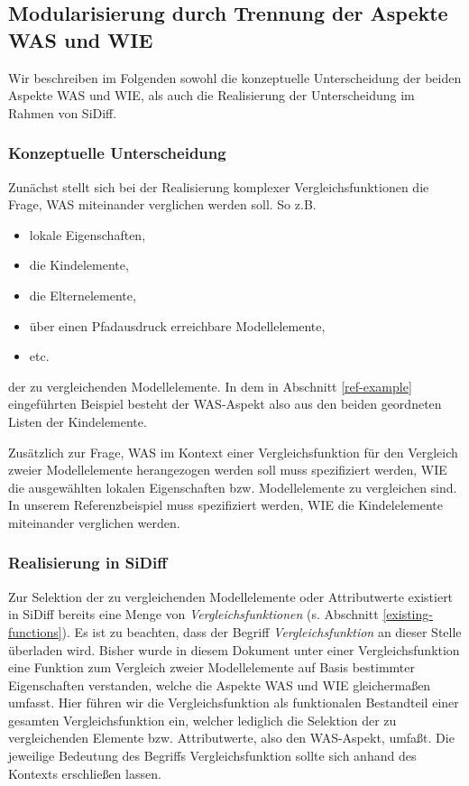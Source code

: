 \documentclass[10pt,a4paper]{scrartcl}
\begin{document}
\subsection{Modularisierung durch Trennung der Aspekte WAS und WIE}
\label{modularisation}

Wir beschreiben im Folgenden sowohl die konzeptuelle Unterscheidung der beiden Aspekte
WAS und WIE, als auch die Realisierung der Unterscheidung im Rahmen von SiDiff.

\subsubsection{Konzeptuelle Unterscheidung}
Zunächst stellt sich bei der Realisierung komplexer Vergleichsfunktionen
die Frage, WAS miteinander verglichen werden soll. So z.B. 
\begin{itemize}
	\item lokale Eigenschaften,
	\item die Kindelemente,
	\item die Elternelemente,
	\item über einen Pfadausdruck erreichbare Modellelemente,
	\item etc.
\end{itemize}
der zu vergleichenden Modellelemente. In dem in Abschnitt \ref{ref-example} eingeführten Beispiel 
besteht der WAS-Aspekt also aus den beiden geordneten Listen der Kindelemente.

Zusätzlich zur Frage, WAS im Kontext einer Vergleichsfunktion für den Vergleich zweier
Modellelemente herangezogen werden soll muss spezifiziert werden, WIE die ausgewählten lokalen
Eigenschaften bzw. Modellelemente zu vergleichen sind. In unserem Referenzbeispiel muss spezifiziert
werden, WIE die Kindelelemente miteinander verglichen werden.

\subsubsection{Realisierung in SiDiff}
Zur Selektion der zu vergleichenden Modellelemente oder Attributwerte existiert in SiDiff bereits eine
Menge von \textit{Vergleichsfunktionen} (s. Abschnitt \ref{existing-functions}). Es ist zu beachten, 
dass der Begriff \textit{Vergleichsfunktion} an dieser Stelle überladen wird. Bisher wurde in diesem
Dokument unter einer Vergleichsfunktion eine Funktion zum Vergleich zweier Modellelemente auf Basis
bestimmter Eigenschaften verstanden, welche die Aspekte WAS und WIE gleichermaßen umfasst. Hier führen
wir die Vergleichsfunktion als funktionalen Bestandteil einer gesamten Vergleichsfunktion ein, welcher
lediglich die Selektion der zu vergleichenden Elemente bzw. Attributwerte, also den WAS-Aspekt, umfaßt.
Die jeweilige Bedeutung des Begriffs Vergleichsfunktion sollte sich anhand des Kontexts erschließen lassen.
\end{document}

